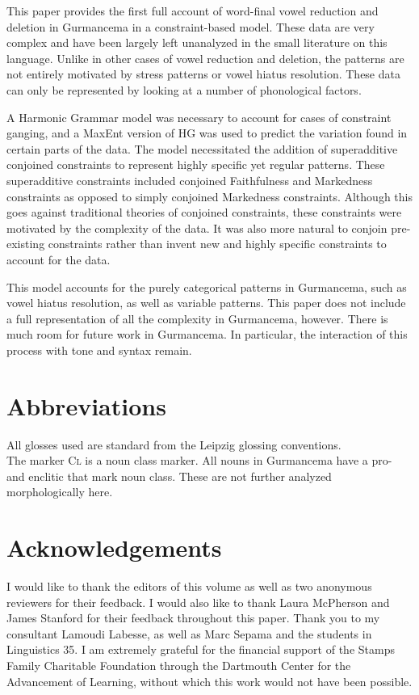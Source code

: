 \documentclass[output=paper,
modfonts
]{langscibook}
\begin{document}
This paper provides the first full account of word-final vowel reduction and deletion in Gurmancema in a constraint-based model. These data are very complex and have been largely left unanalyzed in the small literature on this language. Unlike in other cases of vowel reduction and deletion, the patterns are not entirely motivated by stress patterns or vowel hiatus resolution. These data can only be represented by looking at a number of phonological factors.  
	
A Harmonic Grammar model was necessary to account for cases of constraint ganging, and a MaxEnt version of HG was used to predict the variation found in certain parts of the data. The model necessitated the addition of superadditive conjoined constraints to represent highly specific yet regular patterns. These superadditive constraints included conjoined Faithfulness and Markedness constraints as opposed to simply conjoined Markedness constraints. Although this goes against traditional theories of conjoined constraints, these constraints were motivated by the complexity of the data. It was also more natural to conjoin pre-existing constraints rather than invent new and highly specific constraints to account for the data.   

This model accounts for the purely categorical patterns in Gurmancema, such as vowel hiatus resolution, as well as variable patterns. This paper does not include a full representation of all the complexity in Gurmancema, however. There is much room for future work in Gurmancema. In particular, the interaction of this process with tone and syntax remain. 

\section*{Abbreviations}
All glosses used are standard from the Leipzig glossing conventions. \\
The marker \textsc{Cl} is a noun class marker. All nouns in Gurmancema have a 
pro- and enclitic that mark noun class. These are not further analyzed 
morphologically here. 

\section*{Acknowledgements}

I would like to thank the editors of this volume as well as two anonymous reviewers for their feedback. I would also like to thank Laura McPherson and James Stanford for their feedback throughout this paper. Thank you to my consultant Lamoudi Labesse, as well as Marc Sepama and the 
students in Linguistics 35. I am extremely grateful for the financial support of the Stamps Family Charitable Foundation through the Dartmouth Center for the Advancement of 
Learning, without which this work would not have been possible. 

\nocite{AlbrightMagri}
\nocite{Boersma96}
\nocite{Casali97}
\nocite{Chantoux}
\nocite{GoldwaterJohnson03}
\nocite{GreenDavis14}
\nocite{HayesWilson08}
\nocite{MoretonSmolensky02}
\nocite{Naba}
\nocite{Rialland80}
\nocite{Rialland01}
\nocite{Ethnologue}
\nocite{Smolensky06}
\nocite{WilsonHayesGeorge08}

\printbibliography[heading=subbibliography,notkeyword=this]
\end{document}
